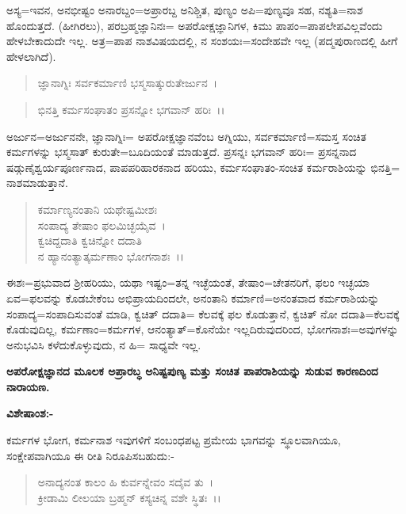 
ಅಸ್ಯ=ಇವನ, ಅನಭೀಷ್ಟಂ ಅನಾರಬ್ದಂ=ಅಪ್ರಾರಬ್ದ ಅನಿಶ್ಚಿತ, ಪುಣ್ಯಂ ಅಪಿ=ಪುಣ್ಯವೂ ಸಹ, ನಶ್ಯತಿ=ನಾಶ ಹೊಂದುತ್ತದೆ. (ಹೀಗಿರಲು), ಪರಬ್ರಹ್ಮಜ್ಞಾನಿನಃ= ಅಪರೋಕ್ಷಜ್ಞಾನಿಗಳ, ಕಿಮು ಪಾಪಂ=ಪಾಪಲೇಪವಿಲ್ಲವೆಂದು ಹೇಳಬೇಕಾದುದೇ ಇಲ್ಲ. ಅತ್ರ=ಪಾಪ ನಾಶವಿಷಯದಲ್ಲಿ, ನ ಸಂಶಯಃ=ಸಂದೇಹವೇ ಇಲ್ಲ (ಪದ್ಮಪುರಾಣದಲ್ಲಿ ಹೀಗೆ ಹೇಳಲಾಗಿದೆ).

\begin{verse}
ಜ್ಞಾನಾಗ್ನಿಃ ಸರ್ವಕರ್ಮಾಣಿ ಭಸ್ಮಸಾತ್ಕುರುತೇರ್ಜುನ~।
\end{verse}


\begin{verse}
ಭಿನತ್ತಿ ಕರ್ಮಸಂಘಾತಂ ಪ್ರಸನ್ನೋ ಭಗವಾನ್ ಹರಿಃ~।।
\end{verse}

ಅರ್ಜುನ=ಅರ್ಜುನನೇ, ಜ್ಞಾನಾಗ್ನಿಃ= ಅಪರೋಕ್ಷಜ್ಞಾನವೆಂಬ ಅಗ್ನಿಯು, ಸರ್ವಕರ್ಮಾಣಿ=ಸಮಸ್ತ ಸಂಚಿತ ಕರ್ಮಗಳನ್ನು ಭಸ್ಮಸಾತ್ ಕುರುತೇ=ಬೂದಿಯಂತೆ ಮಾಡುತ್ತದೆ. ಪ್ರಸನ್ನಃ ಭಗವಾನ್ ಹರಿಃ= ಪ್ರಸನ್ನನಾದ ಷಡ್ಗುಣೈಶ್ವರ್ಯಪೂರ್ಣನಾದ, ಪಾಪಪರಿಹಾರಕನಾದ ಹರಿಯು, ಕರ್ಮಸಂಘಾತಂ-ಸಂಚಿತ ಕರ್ಮರಾಶಿಯನ್ನು ಭಿನತ್ತಿ= ನಾಶಮಾಡುತ್ತಾನೆ.

\begin{verse}
ಕರ್ಮಾಣ್ಯನಂತಾನಿ ಯಥೇಷ್ಟಮೀಶಃ\\ ಸಂಪಾದ್ಯ ತೇಷಾಂ ಫಲಮಿಚ್ಛಯೈವ~।\\ ಕ್ವಚಿದ್ದದಾತಿ ಕ್ವಚಿನ್ನೋ ದದಾತಿ\\ ನ ಹ್ಯಾನಂತ್ಯಾತ್ಕರ್ಮಣಾಂ ಭೋಗನಾಶಃ~।।
\end{verse}

ಈಶಃ=ಪ್ರಭುವಾದ ಶ‍್ರೀಹರಿಯು, ಯಥಾ ಇಷ್ಟಂ=ತನ್ನ ಇಚ್ಛೆಯಂತೆ, ತೇಷಾಂ=ಚೇತನರಿಗೆ, ಫಲಂ ಇಚ್ಛಯಾ ಏವ=ಫಲವನ್ನು ಕೊಡಬೇಕೆಂಬ ಅಭಿಪ್ರಾಯದಿಂದಲೇ, ಅನಂತಾನಿ ಕರ್ಮಾಣಿ=ಅನಂತವಾದ ಕರ್ಮರಾಶಿಯನ್ನು ಸಂಪಾದ್ಯ=ಸಂಪಾದಿಸುವಂತೆ ಮಾಡಿ, ಕ್ವಚಿತ್ ದದಾತಿ= ಕೆಲವಕ್ಕೆ ಫಲ ಕೊಡುತ್ತಾನೆ, ಕ್ವಚಿತ್ ನೋ ದದಾತಿ=ಕೆಲವಕ್ಕೆ ಕೊಡುವುದಿಲ್ಲ, ಕರ್ಮಣಾಂ=ಕರ್ಮಗಳ, ಆನಂತ್ಯಾತ್=ಕೊನೆಯೇ ಇಲ್ಲದಿರುವುದರಿಂದ, ಭೋಗನಾಶಃ=ಅವುಗಳನ್ನು ಅನುಭವಿಸಿ ಕಳೆದುಕೊಳ್ಳುವುದು, ನ ಹಿ= ಸಾಧ್ಯವೇ ಇಲ್ಲ.

\begin{center}
\textbf{ಅಪರೋಕ್ಷಜ್ಞಾನದ ಮೂಲಕ ಅಪ್ರಾರಬ್ಧ ಅನಿಷ್ಟಪುಣ್ಯ ಮತ್ತು ಸಂಚಿತ ಪಾಪರಾಶಿಯನ್ನು ಸುಡುವ ಕಾರಣದಿಂದ ನಾರಾಯಣ.}
\end{center}

\noindent
\textbf{ವಿಶೇಷಾಂಶ:-}

ಕರ್ಮಗಳ ಭೋಗ, ಕರ್ಮನಾಶ ಇವುಗಳಿಗೆ ಸಂಬಂಧಪಟ್ಟ ಪ್ರಮೇಯ ಭಾಗವನ್ನು ಸ್ಥೂಲವಾಗಿಯೂ, ಸಂಕ್ಷೇಪವಾಗಿಯೂ ಈ ರೀತಿ ನಿರೂಪಿಸಬಹುದು:-

\begin{verse}
ಅನಾದ್ಯನಂತ ಕಾಲಂ ಹಿ ಕುರ್ವನ್ನೇವಂ ಸದೈವ ತು~।\\ ಕ್ರೀಡಾಮಿ ಲೀಲಯಾ ಬ್ರಹ್ಮನ್ ಕಸ್ಯಚಿನ್ನ ವಶೇ ಸ್ಥಿತಃ~।।
\end{verse}


